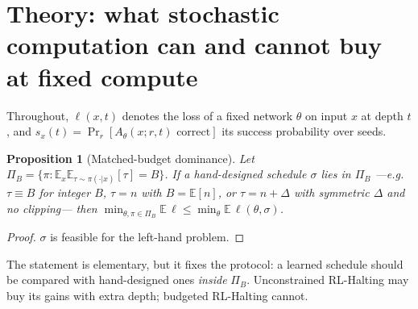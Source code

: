 \documentclass[10pt]{article}
\newtheorem{proposition}{Proposition}
\theoremstyle{definition}
\theoremstyle{remark}
\newcommand{\E}{\mathbb{E}}
\begin{document}
\section{Theory: what stochastic computation can and cannot buy at fixed compute}
\label{sec:theory}

Throughout, $\ell(x,t)$ denotes the loss of a fixed network $\theta$ on input $x$ at depth $t$, and
$s_x(t)=\Pr_r[A_\theta(x;r,t)\text{ correct}]$ its success probability over seeds.

\begin{proposition}[Matched-budget dominance]\label{prop:dominance}
Let $\Pi_B=\{\pi:\E_x\E_{\tau\sim\pi(\cdot|x)}[\tau]=B\}$.  If a hand-designed schedule $\sigma$ lies in $\Pi_B$
---e.g.\ $\tau\equiv B$ for integer $B$, $\tau=n$ with $B=\E[n]$, or $\tau=n+\Delta$ with symmetric $\Delta$ and
no clipping--- then $\min_{\theta,\pi\in\Pi_B}\E\,\ell\le\min_\theta\E\,\ell(\theta,\sigma)$.
\end{proposition}
\begin{proof}$\sigma$ is feasible for the left-hand problem.\end{proof}
The statement is elementary, but it fixes the protocol: a learned schedule should be compared with hand-designed ones
\emph{inside} $\Pi_B$.  Unconstrained RL-Halting may buy its gains with extra depth; budgeted RL-Halting cannot.
\end{document}

